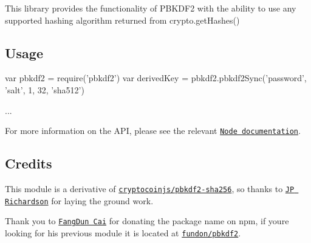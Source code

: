 \href{https://www.npmjs.org/package/pbkdf2}{\tt } \href{https://travis-ci.org/crypto-browserify/pbkdf2}{\tt } \href{https://david-dm.org/crypto-browserify/pbkdf2#info=dependencies}{\tt }

\href{https://github.com/feross/standard}{\tt }

This library provides the functionality of P\+B\+K\+D\+F2 with the ability to use any supported hashing algorithm returned from {\ttfamily crypto.\+get\+Hashes()}

\subsection*{Usage}


\begin{DoxyCode}
var pbkdf2 = require('pbkdf2')
var derivedKey = pbkdf2.pbkdf2Sync('password', 'salt', 1, 32, 'sha512')

...
\end{DoxyCode}


For more information on the A\+PI, please see the relevant \href{https://nodejs.org/api/crypto.html#crypto_crypto_pbkdf2_password_salt_iterations_keylen_digest_callback}{\tt Node documentation}.

\subsection*{Credits}

This module is a derivative of \href{https://github.com/cryptocoinjs/pbkdf2-sha256/}{\tt cryptocoinjs/pbkdf2-\/sha256}, so thanks to \href{https://github.com/jprichardson/}{\tt JP Richardson} for laying the ground work.

Thank you to \href{https://github.com/fundon}{\tt Fang\+Dun Cai} for donating the package name on npm, if you\textquotesingle{}re looking for his previous module it is located at \href{https://github.com/fundon/pbkdf2}{\tt fundon/pbkdf2}. 